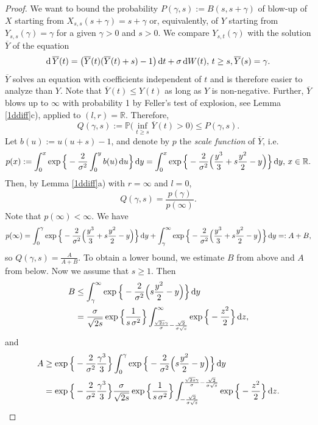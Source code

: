\documentclass[sn-mathphys-num]{sn-jnl}
\theoremstyle{definition}
\newcommand{\scr}[1]{\mathscr #1}
\numberwithin{equation}{section} \theoremstyle{remark}
\renewcommand{\d}{\hbox{d}}
\def\R{\mathbb R}
\def\d{\text{\rm{d}}} \def\bb{\beta} \def\aa{\alpha} \def\D{\scr D}
\def\P{\mathbb P}
\newcommand{\1}{\mathbbm{1}}
\renewcommand{\bar}{\overline}
\begin{document}
\begin{proof} We want to bound the probability $P(\gamma,s):=B(s,s+\gamma)$ of blow-up of $X$ starting from $X_{s,s}(s+\gamma)=s+\gamma$ or, equivalently, of $Y$ starting from $Y_{s,s}(\gamma)=\gamma$ for a given $\gamma>0$ and $s>0$. We compare $Y_{s,t}(\gamma)$ with the solution $\bar Y$ of the equation
\begin{equation}\label{ybar}
\d\,\bar Y(t) =\big(\bar Y(t)(\bar Y(t)+s)-1\big)\,\d t + \sigma\,\d W(t),\,t \geq s,\bar Y(s)=\gamma.
\end{equation}
$\bar Y$ solves an equation with  coefficients independent of $t$ and is therefore easier to analyze than $Y$.
Note that $\bar Y(t) \leq Y(t)$ as long as $Y$ is non-negative. Further, $\bar Y$ blows up to $\infty$ with probability 1 by  Feller's test of explosion, see Lemma \ref{1ddiff}c), applied to $(l,r)=\R$. Therefore,
$$
Q(\gamma,s):=\P\big(\inf_{t \geq s}  \bar Y(t) > 0\big) \leq P(\gamma,s).
$$
Let $b(u):=u(u+s)-1$, and  denote by $p$ the {\em scale function} of $\bar Y$, i.e.
$$
p(x):=\int_0^x \exp\Big\{-\frac 2 {\sigma^2}\int_0^y b(u)\,\d u\Big\}\,\d y=    
\int_0^x \exp\Big\{-\frac 2 {\sigma^2}\Big(\frac{y^3}3+s\frac{y^2}2-y     \Big)\Big\}\,\d y,\,x \in \R.
$$
Then, by Lemma \ref{1ddiff}a) with $r=\infty$ and $l=0$,
$$Q(\gamma,s)=\frac {p(\gamma)}{p(\infty)}.
$$
Note that $p(\infty)<\infty$. We have
$$
p(\infty)=\int_0^\gamma \exp\Big\{-\frac 2 {\sigma^2}\Big(\frac{y^3}3+s\frac{y^2}2-y     \Big)\Big\}\,\d y+\int_\gamma^\infty \exp\Big\{-\frac 2 {\sigma^2}\Big(\frac{y^3}3+s\frac{y^2}2-y     \Big)\Big\}\,\d y=:A+B,
$$
so $Q(\gamma,s)=\frac A{A+B}$. To obtain a lower bound, we estimate $B$ from above and $A$ from below. 
Now we assume  that $s \geq 1$. Then
\begin{align*}
B &\leq \int_\gamma^\infty \exp\Big\{-\frac 2 {\sigma^2}\Big(s\frac{y^2}2-y     \Big)\Big\}\,\d y\\
&=\frac\sigma{\sqrt{2s}}\exp\Big\{  \frac 1{s\,\sigma^2 }  \Big\}\int^\infty_{\frac{\sqrt{2s}\gamma}\sigma -\frac{\sqrt 2}{\sigma \sqrt s}}\exp\Big\{-\frac {z^2}2\Big\}\,\d z,
\end{align*}
and 
\begin{align*}
A &\geq \exp\Big\{-\frac 2{\sigma^2} \frac{\gamma^3}3\Big\}  \int_0^\gamma \exp\Big\{-\frac 2 {\sigma^2}\Big(s\frac{y^2}2-y     \Big)\Big\}\,\d y\\
&    =  \exp\Big\{-\frac 2{\sigma^2} \frac{\gamma^3}3\Big\}  \frac\sigma{\sqrt{2s}}\exp\Big\{  \frac 1{s\,\sigma^2 }  \Big\}\int_{-\frac{\sqrt 2}{\sigma \sqrt s}}^{\frac{\sqrt{2s}\gamma}\sigma -\frac{\sqrt 2}{\sigma \sqrt s}}\exp\Big\{-\frac {z^2}2\Big\}\,\d z.

\end{align*}
\end{proof}
\end{document}
